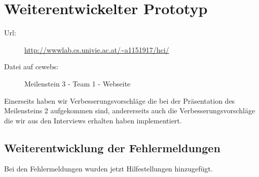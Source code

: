 \documentclass[a4paper,10pt]{scrartcl}
\begin{document}
\section{Weiterentwickelter Prototyp}

\begin{description}
 \item[Url:] \url{http://wwwlab.cs.univie.ac.at/~a1151917/hci/}
 \item[Datei auf cewebs:]Meilenstein 3 - Team 1 - Webseite
\end{description}

Einerseits haben wir Verbesserungsvorschläge die bei der Präsentation des Meilensteins 2 aufgekommen sind, andererseits auch
die Verbesserungsvorschläge die wir aus den Interviews erhalten haben implementiert.

\subsection{Weiterentwicklung der Fehlermeldungen}

Bei den Fehlermeldungen wurden jetzt Hilfestellungen hinzugefügt.

\noindent{}
\medskip


\noindent{}
\medskip
\end{document}
